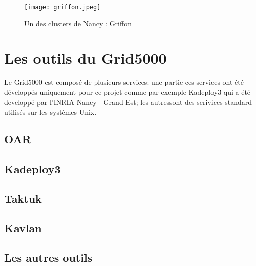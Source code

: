 \documentclass [10pt,a4paper]{report}
\begin{document}
\begin{figure}[!h]
		\centering
   		\texttt{[image: griffon.jpeg]}
   		\caption{Un des clusters de Nancy : Griffon}
    	\label{fig:griffon}
	\end{figure}
	
	\chapter{Les outils du Grid5000}
		Le Grid5000 est composé de plusieurs services: une partie ces services ont été développés uniquement pour ce projet comme par exemple Kadeploy3 qui a été developpé par l'INRIA Nancy - Grand Est; les autressont des serivices standard utilisés sur les systèmes Unix.  
		\section{OAR}	
		\section{Kadeploy3}
		\section{Taktuk}
		\section{Kavlan}
		\section{Les autres outils}
		
\end{document}
